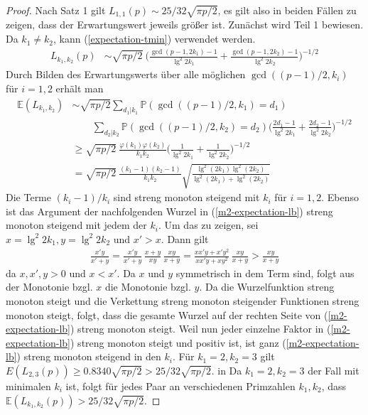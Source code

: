 \documentclass[a4paper, 10pt, ngerman]{article}
\newcommand{\E}{\mathbb{E}}
\renewcommand{\P}{\mathbb{P}}
\begin{document}
\begin{proof}
    Nach Satz 1 gilt $L_{1, 1}(p) \sim 25/32 \sqrt{\pi p /2}$, es gilt also in beiden Fällen zu zeigen, dass der Erwartungswert jeweils größer ist. Zunächst wird Teil 1 bewiesen. Da $k_1 \ne k_2$, kann (\ref{expectation-tmin}) verwendet werden.
    \begin{align*}
        L_{k_1, k_2}(p)
         & \sim \sqrt{\pi p / 2} \ \Bigg ( \frac {\gcd(p - 1, 2k_1) - 1} {\lg^2 2k_1} + \frac {\gcd(p -1, 2k_2) - 1} {\lg^2 2k_2} \Bigg )^{-1/2}
    \end{align*}
    Durch Bilden des Erwartungswerts über alle möglichen $\gcd((p - 1)/2, k_i)$ für $i = 1, 2$ erhält man
    \begin{align}
        \E(L_{k_1, k_2})
         & \sim \sqrt{\pi p / 2} \sum_{d_1 | k_1} \P(\gcd((p - 1)/2, k_1) = d_1) \nonumber                                                                                                                                                                   \\
         & \qquad \sum_{d_2 | k_2} \P(\gcd((p - 1)/2, k_2) = d_2)                                                                                             \Bigg ( \frac {2d_1 - 1} {\lg^2 2k_1} + \frac {2d_2 - 1} {\lg^2 2k_2} \Bigg )^{-1/2} \nonumber \\
         & \ge \sqrt{\pi p / 2} \ \frac {\varphi(k_1) \varphi(k_2)} {k_1k_2} \Bigg (\frac 1 {\lg^2 2k_1} + \frac 1 {\lg^2 2k_2} \Bigg )^{-1/2} \nonumber                                                                                                     \\
         & = \sqrt{\pi p / 2} \ \frac {(k_1 - 1) (k_2- 1)} {k_1k_2} \sqrt{\frac{\lg^2(2k_1) \lg^2(2k_2)}{\lg^2(2k_1) + \lg^2(2k_2)}} \label{m2-expectation-lb}
    \end{align}
    Die Terme $(k_i - 1)/k_i$ sind streng monoton steigend mit $k_i$ für $i = 1, 2$. Ebenso ist das Argument der nachfolgenden Wurzel in (\ref{m2-expectation-lb}) streng monoton steigend mit jedem der $k_i$. Um das zu zeigen, sei $x = \lg^2 2k_1, y = \lg^2 2k_2$ und $x' > x$. Dann gilt
    \begin{align*}
        \frac {x'y} {x' + y}
        = \frac {x'y} {x' + y} \, \frac {x + y} {xy} \, \frac {xy} {x + y}
        = \frac {xx'y + x'y^2} {xx'y + xy^2} \, \frac {xy} {x + y} > \frac {xy} {x + y}
    \end{align*}
    da $x, x', y > 0$ und $x < x'$. Da $x$ und $y$ symmetrisch in dem Term sind, folgt aus der Monotonie bzgl. $x$ die Monotonie bzgl. $y$. Da die Wurzelfunktion streng monoton steigt und die Verkettung streng monoton steigender Funktionen streng monoton steigt, folgt, dass die gesamte Wurzel auf der rechten Seite von (\ref{m2-expectation-lb}) streng monoton steigt. Weil nun jeder einzelne Faktor in (\ref{m2-expectation-lb}) streng monoton steigt und positiv ist, ist ganz (\ref{m2-expectation-lb}) streng monoton steigend in den $k_i$. Für $k_1 = 2, k_2 = 3$ gilt $E(L_{2, 3}(p)) \ge 0.8340 \sqrt{\pi p /2}  > 25 / 32 \sqrt{\pi p / 2}$. in Da $k_1 = 2, k_2 = 3$ der Fall mit minimalen $k_i$ ist, folgt für jedes Paar an verschiedenen Primzahlen $k_1, k_2$, dass $\E(L_{k_1, k_2}(p)) > 25 / 32 \sqrt{\pi p / 2}$.


\end{proof}
\end{document}
